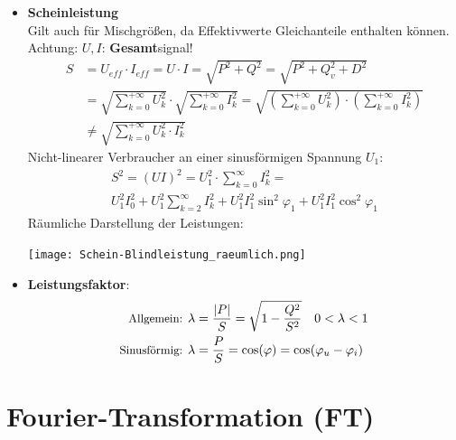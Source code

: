 \begin{itemize}
	      
	      \begin{mdframed}[style=exercise,frametitle=Verzerrungsblindleistung $D$]
	      		      {\small auch Oberwellen-, Deformationsblindleistung.}
		      \[
			      D^2 = U_1^2\cdot(I^2-I_1^2) = S^2(1-g^2)
		      \]
\small{aus Mischtermen als Produkte von $U$ und $I$ unterschiedlicher Frequenzen.}
	      \end{mdframed}
  		\item \textbf{Scheinleistung}\\
{\small Gilt auch f\"ur Mischgr\"o\ss en, da Effektivwerte Gleichanteile enthalten k\"onnen. Achtung: $U, I$: \textbf{Gesamt}signal!}
\begin{align*}
	      S &= U_{\mathit{eff}}\cdot I_{\mathit{eff}} = U\cdot I = \sqrt{P^2+Q^2} = \sqrt{P^2+Q_v^2+D^2}\\
	      &=  \sqrt{\sum_{k=0}^{+\infty} U_k^2} \cdot \sqrt{\sum_{k=0}^{+\infty} I_k^2} = \sqrt{\left( \sum_{k=0}^{+\infty} U_k^2 \right) \cdot \left( \sum_{k=0}^{+\infty} I_k^2 \right)}\\
	      &\neq \sqrt{\sum_{k=0}^{+\infty} U_k^2 \cdot I_k^2}
\end{align*}
	      	Nicht-linearer Verbraucher an einer sinusförmigen Spannung $U_1$:
	      	\vspace{-1.5em}
	      	\begin{multline*}
	      		S^{2}=(U I)^{2}=U_{1}^{2} \cdot \sum_{k=0}^{\infty} I_{k}^{2}=\\U_{1}^{2} I_{0}^{2}+U_{1}^{2} \sum_{k=2}^{\infty} I_{k}^{2}+U_{1}^{2} I_{1}^{2} \sin ^{2} \varphi_{1}+U_{1}^{2} I_{1}^{2} \cos ^{2} \varphi_{1}
	      	\end{multline*}
	      Räumliche Darstellung der Leistungen:
	      \begin{center}
	      	\vspace{-0.5em}
	      	\texttt{[image: Schein-Blindleistung\_raeumlich.png]}
	      	\vspace{-0.6em}
	      \end{center}
	      \item \textbf{Leistungsfaktor}:
\begin{align*}
	\text{\small Allgemein: }
	      \lambda &= \frac{|P|}{S} = \sqrt{1-\frac{Q^2}{S^2}} \quad 0<\lambda<1\\
	     \text{\small Sinusf\"ormig: }\lambda &= \frac{P}{S}=\cos(\varphi)=\cos(\varphi_u-\varphi_i)
\end{align*}
\end{itemize}
\clearpage
\section{Fourier-Transformation (FT)}
